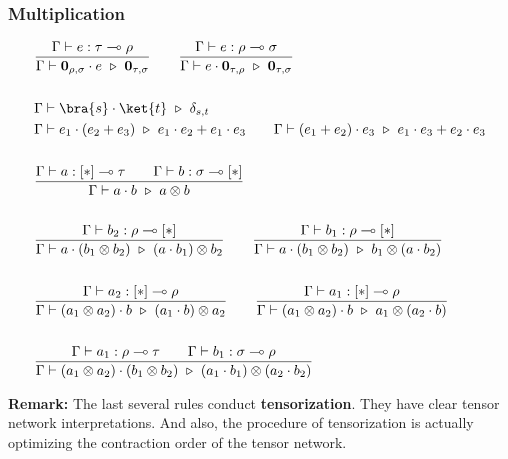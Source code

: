 \subsubsection*{Multiplication}
\begin{align*}
  & \frac{\Gamma \vdash e : \tau \multimap \rho}{\Gamma \vdash \textbf{0}_{\rho, \sigma} \cdot e \ \triangleright\ \textbf{0}_{\tau, \sigma}}
  \qquad 
  \frac{\Gamma \vdash e : \rho \multimap \sigma}{\Gamma \vdash e \cdot \textbf{0}_{\tau, \rho} \ \triangleright\ \textbf{0}_{\tau, \sigma}}\\
  &\ \\
  & \Gamma \vdash \bra{s} \cdot \ket{t} \ \triangleright\ \delta_{s, t}\\ 
  & \Gamma \vdash e_1 \cdot (e_2 + e_3) \ \triangleright\ e_1 \cdot e_2 + e_1 \cdot e_3
  \qquad \Gamma \vdash (e_1 + e_2) \cdot e_3 \ \triangleright\ e_1 \cdot e_3 + e_2 \cdot e_3 \\
  &\ \\
  & \frac{\Gamma \vdash a : [*] \multimap \tau\qquad \Gamma \vdash b : \sigma \multimap [*]}{\Gamma \vdash a \cdot b \ \triangleright\ a \otimes b}\\
  &\ \\
  & \frac{\Gamma \vdash b_2 : \rho \multimap [*]}{\Gamma \vdash a \cdot (b_1 \otimes b_2) \ \triangleright\ (a \cdot b_1) \otimes b_2}
  \qquad
  \frac{\Gamma \vdash b_1 : \rho \multimap [*]}{\Gamma \vdash a \cdot (b_1 \otimes b_2) \ \triangleright\ b_1 \otimes (a \cdot b_2)}\\
  &\ \\
  & \frac{\Gamma \vdash a_2 : [*] \multimap \rho}{\Gamma \vdash (a_1 \otimes a_2) \cdot b \ \triangleright\ (a_1 \cdot b) \otimes a_2}
  \qquad
  \frac{\Gamma \vdash a_1 : [*] \multimap \rho}{\Gamma \vdash (a_1 \otimes a_2) \cdot b \ \triangleright\ a_1 \otimes (a_2 \cdot b)}\\
  &\ \\
  & \frac{\Gamma \vdash a_1 : \rho \multimap \tau \qquad \Gamma \vdash b_1 : \sigma \multimap \rho}{\Gamma \vdash (a_1 \otimes a_2) \cdot (b_1 \otimes b_2) \ \triangleright\ (a_1 \cdot b_1) \otimes (a_2 \cdot b_2)}
\end{align*}

\textbf{Remark: } The last several rules conduct \textbf{tensorization}. They have clear tensor network interpretations. And also, the procedure of tensorization is actually optimizing the contraction order of the tensor network.


